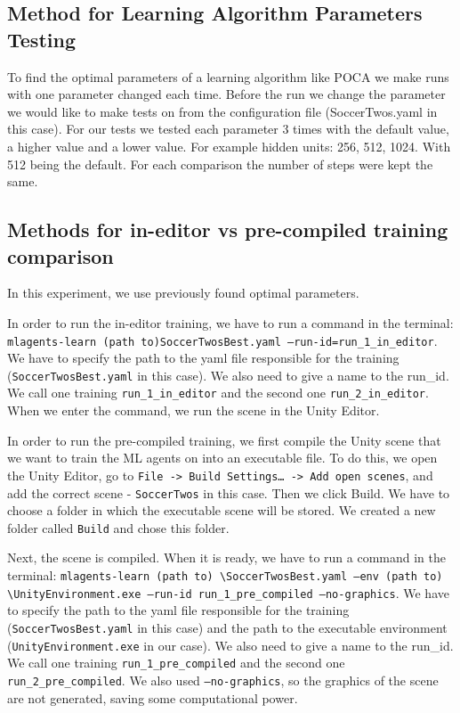 \documentclass{LSkill}
\begin{document}
\subsection{Method for Learning Algorithm Parameters Testing}
To find the optimal parameters of a learning algorithm like POCA we make runs with one parameter changed each time. Before the run we change the parameter we would like to make tests on from the configuration file (SoccerTwos.yaml in this case). For our tests we tested each parameter 3 times with the default value, a higher value and a lower value. For example hidden units:  256,  512,  1024. With 512 being the default. For each comparison the number of steps were kept the same.

\subsection{Methods for in-editor vs pre-compiled training comparison}
In this experiment, we use previously found optimal parameters.

In order to run the in-editor training, we have to run a command in the terminal: 
\texttt{mlagents-learn (path to)SoccerTwosBest.yaml --run-id=run\_1\_in\_editor}. We have to specify the path to the yaml file responsible for the training (\texttt{SoccerTwosBest.yaml} in this case). We also need to give a name to the run\_id. We call one training \texttt{run\_1\_in\_editor} and the second one \texttt{run\_2\_in\_editor}. When we enter the command, we run the scene in the Unity Editor.

In order to run the pre-compiled training, we first compile the Unity scene that we want to train the ML agents on into an executable file. To do this, we open the Unity Editor, go to \texttt{File -> Build Settings… -> Add open scenes}, and add the correct scene - \texttt{SoccerTwos} in this case. Then we click Build. We have to choose a folder in which the executable scene will be stored. 
We created a new folder called \texttt{Build} and chose this folder. 

Next, the scene is compiled. When it is ready, we have to run a command in the terminal: \texttt{mlagents-learn (path to) \textbackslash SoccerTwosBest.yaml --env (path to) \textbackslash UnityEnvironment.exe --run-id run\_1\_pre\_compiled --no-graphics}. We have to specify the path to the yaml file responsible for the training (\texttt{SoccerTwosBest.yaml} in this case) and the path to the executable environment (\texttt{UnityEnvironment.exe} in our case). We also need to give a name to the run\_id. We call one training \texttt{run\_1\_pre\_compiled} and the second one 
\texttt{run\_2\_pre\_compiled}. We also used \texttt{--no-graphics}, so the graphics 
of the scene are not generated, saving some computational power.
\end{document}

